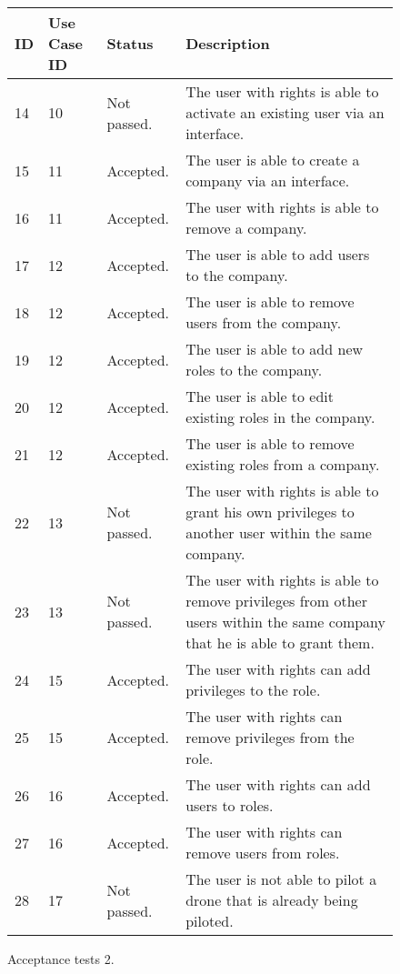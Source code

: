\begin{figure}[htb]
\begin{center}
\begin{tabular}{ | l | l | l | p{8cm} | }
  \hline
	\textbf{ID} & \textbf{Use Case ID} & \textbf{Status} & \textbf{Description} \\ \hline
	14 & 10 & Not passed. & The user with rights is able to activate an existing user via an interface.  \\ \hline
	15 & 11 & Accepted. & The user is able to create a company via an interface.  \\ \hline
	16 & 11 & Accepted. & The user with rights is able to remove a company. \\ \hline
	17 & 12 & Accepted. & The user is able to add users to the company.   \\ \hline
	18 & 12 & Accepted. & The user is able to remove users from the company.  \\ \hline
	19 & 12 & Accepted. & The user is able to add new roles to the company.  \\ \hline
	20 & 12 & Accepted. & The user is able to edit existing roles in the company.  \\ \hline
	21 & 12 & Accepted. & The user is able to remove existing roles from a company.  \\ \hline
	22 & 13 & Not passed. & The user with rights is able to grant his own privileges to another user within the same company.  \\ \hline
	23 & 13 & Not passed. & The user with rights is able to remove privileges from other users within the same company that he is able to grant them.  \\ \hline
	24 & 15 & Accepted. & The user with rights can add privileges to the role.  \\ \hline
	25 & 15 & Accepted. & The user with rights can remove privileges from the role.  \\ \hline
	26 & 16 & Accepted. & The user with rights can add users to roles.  \\ \hline
	27 & 16 & Accepted. & The user with rights can remove users from roles.  \\ \hline
	28 & 17 & Not passed. & The user is not able to pilot a drone that is already being piloted. \\
  \hline
\end{tabular}
\caption{Acceptance tests 2.}
\label{tab:acceptance_tests2_results}
\end{center}
\end{figure}


